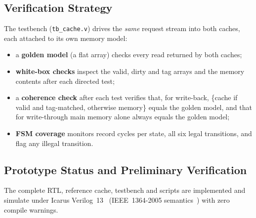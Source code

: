 \documentclass[conference]{IEEEtran}
\begin{document}
\subsection{Verification Strategy}
The testbench (\texttt{tb\_cache.v}) drives the \emph{same} request stream into
both caches, each attached to its own memory model:
\begin{itemize}
\item a \textbf{golden model} (a flat array) checks every read returned by
both caches;
\item \textbf{white-box checks} inspect the valid, dirty and tag arrays and the
memory contents after each directed test;
\item a \textbf{coherence check} after each test verifies that, for
write-back, \{cache if valid and tag-matched, otherwise memory\} equals the
golden model, and that for write-through main memory alone always equals the
golden model;
\item \textbf{FSM coverage} monitors record cycles per state, all six legal
transitions, and flag any illegal transition.
\end{itemize}

\subsection{Prototype Status and Preliminary Verification}\label{sec:prelim}
The complete RTL, reference cache, testbench and scripts are implemented and
simulate under Icarus Verilog~13~\cite{icarus} (IEEE~1364-2005
semantics~\cite{ieee1364}) with zero compile warnings.
\end{document}
